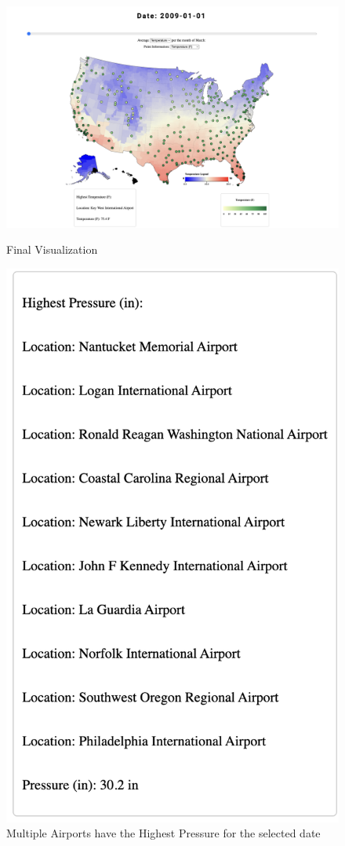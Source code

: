 \documentclass[10pt,twocolumn,twoside]{opticajnl}
\begin{document}
\begin{figure}
    \centering
    \includegraphics[scale=0.15]{images/img7.png}
    \caption{Final Visualization}

    \includegraphics[scale=0.5]{images/img8.png}
    \caption{Multiple Airports have the Highest Pressure for the selected date}
\end{figure}
\end{document}
